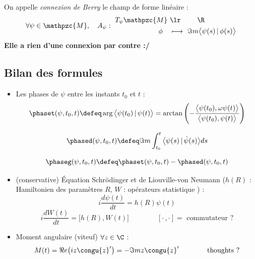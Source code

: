 \begin{definition}\label{def:berry_connx}
	On appelle \emph{connexion de Berry} le champ de forme linéaire :
	\begin{equation}\label{eq:berry_connx}
		\forall \psi\in\mathpzc{M},\quad A_\psi :\ \begin{aligned} T_\psi\mathpzc{M}\ &\lr\qquad\ \R \\ \phi\quad &\longmapsto\ \Im m \big\langle \psi(s) \, |\, \phi(s) \big\rangle
		\end{aligned}
	\end{equation}
	\textbf{Elle a rien d'une connexion par contre :/}
\end{definition}



\subsection{Bilan des formules}

\begin{itemize}
	\item Les phases de $\psi$ entre les instants $t_0$ et $t$ :
	\begin{equation}\label{eq:phase_tot}
		\phaset(\psi, t_0, t) \defeq \arg\big\langle\psi(t_0) \,|\, \psi(t)\big\rangle = \arctan \left( -\frac{\big\langle\psi(t_0), \omega\psi(t)\big\rangle}{\big\langle\psi(t_0), \psi(t)\big\rangle} \right)
	\end{equation}
	
	\begin{equation}\label{eq:phase_dyn}
		\phased(\psi,t_0,t) \defeq \Im m \int_{t_0}^t\big\langle \psi(s) \,|\, \dot{\psi}(s) \big\rangle ds
	\end{equation}
	
	\begin{equation}\label{eq:phase_geo}
		\phaseg(\psi, t_0, t) \defeq \phaset(\psi, t_0, t) - \phased(\psi,t_0,t)
	\end{equation}
	
	\item (conservative) Équation Schrödinger et de Liouville-von Neumann ($h(R)$ : Hamiltonien des paramètres $R$, $W$ : opérateurs statistique ) \cite[p.6]{bohm_geometric_2003} :
	\begin{equation}%
		i\frac{d \psi(t)}{dt} = h(R)\psi(t)
	\end{equation}
	\begin{equation}\label{eq:liouville-neumann}
		i\frac{d W(t)}{dt} = \big[h(R),W(t)\big] \qquad\qquad [\cdot\,,\cdot]=\text{ commutateur ?}
	\end{equation}
	
	\item Moment angulaire (viteuf) $\forall z\in\C$ :
	\begin{equation}\label{eq:mom_angu}
		M(t) = \Re e \big(iz\congu{z}'\big) = -\Im m z\congu{z}'  \qquad\qquad \text{thoughts ?}
	\end{equation}
	
\end{itemize}


